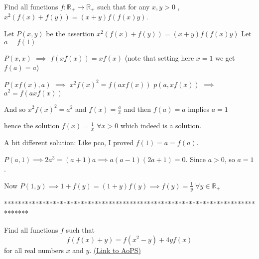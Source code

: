 \begin{solution}
	\begin{tcolorbox}Find all functions $f: \mathbb{R_+}\to\mathbb{R_+}$ such that for any  $x,y>0$ , $x^2(f(x)+f(y))=(x+y)f(f(x)y)$.\end{tcolorbox}
Let $P(x,y)$ be the assertion $x^2(f(x)+f(y))=(x+y)f(f(x)y)$
Let $a=f(1)$

$P(x,x)$ $\implies$ $f(xf(x))=xf(x)$ (note that setting here $x=1$ we get $f(a)=a$)

$P(xf(x),a)$ $\implies$ $x^2f(x)^2=f(axf(x))$
$p(a,xf(x))$ $\implies$ $a^2=f(axf(x))$

And so $x^2f(x)^2=a^2$ and $f(x)=\frac ax$ and then $f(a)=a$ implies $a=1$

hence the solution $\boxed{f(x)=\frac 1x}$ $\forall x>0$ which indeed is a solution.
\end{solution}



\begin{solution}
	A bit different solution:
Like pco, I proved $f(1)=a=f(a)$.

$P(a,1)\implies 2a^3=(a+1)a\implies a(a-1)(2a+1)=0$. Since $a>0$, so $a=1$.

Now $P(1,y)\implies 1+f(y)=(1+y)f(y)\implies f(y)=\frac 1 y\; \forall y\in \mathbb R_+$
\end{solution}
*******************************************************************************
-------------------------------------------------------------------------------

\begin{problem}
	Find all functions $f$ such that
\[f(f(x) + y) = f(x^2-y) + 4yf(x)\]
for all real numbers $x$ and $y$.
	\flushright \href{https://artofproblemsolving.com/community/c6h530789}{(Link to AoPS)}
\end{problem}



